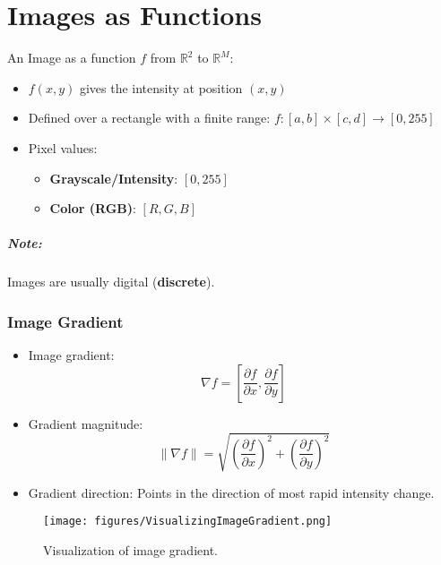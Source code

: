 \chapter{Images as Functions}

An Image as a function $ f $ from $ \mathbb{R}^2 $ to $ \mathbb{R}^M $:
\begin{itemize}
    \item $ f(x,y) $ gives the intensity at position $ (x,y) $
    \item Defined over a rectangle with a finite range:
    $ f: [a,b] \times [c,d] \rightarrow [0,255] $
    \item Pixel values:
    \begin{itemize}
        \item \textbf{Grayscale/Intensity}: $[0,255]$
        \item \textbf{Color (RGB)}: $[R, G, B]$
    \end{itemize}
\end{itemize}

\paragraph{Note:} Images are usually digital (\textbf{discrete}).

\subsection{Image Gradient}
\begin{itemize}
    \item Image gradient:
    $$
    \nabla f = \left[\frac{\partial f}{\partial x}, \frac{\partial f}{\partial y}\right]
    $$
    \item Gradient magnitude:
    $$
    \|\nabla f\| = \sqrt{\left(\frac{\partial f}{\partial x}\right)^2 + \left(\frac{\partial f}{\partial y}\right)^2}
    $$
    \item Gradient direction: Points in the direction of most rapid intensity change.
\end{itemize}

\begin{figure}[htbp]
    \centering
    \texttt{[image: figures/VisualizingImageGradient.png]}
    \caption{Visualization of image gradient.}
\end{figure}

\clearpage

